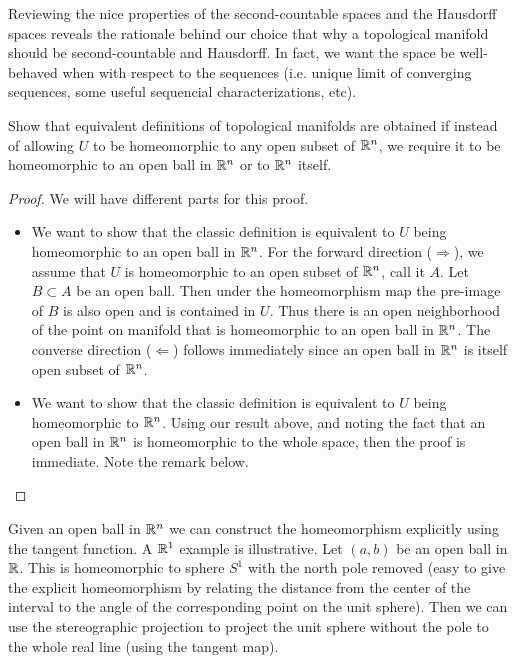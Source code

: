Reviewing the nice properties of the second-countable spaces and the Hausdorff spaces reveals the rationale behind our choice that why a topological manifold should be second-countable and Hausdorff. In fact, we want the space be well-behaved when with respect to the sequences (i.e. unique limit of converging sequences, some useful sequencial characterizations, etc).


\begin{problem}
	Show that equivalent definitions of topological manifolds are obtained if instead of allowing $ U $ to be homeomorphic to any open subset of $ \mathbb{R}^n $, we require it to be homeomorphic to an open ball in $ \mathbb{R}^n $ or to $ \mathbb{R}^n $ itself.
\end{problem}
\begin{proof}
	We will have different parts for this proof.
	\begin{itemize}
		\item We want to show that the classic definition is equivalent to $ U $ being homeomorphic to an open ball in $ \mathbb{R}^n $. For the forward direction ($ \boxed{\Longrightarrow} $), we assume that $ U $ is homeomorphic to an open subset of $ \mathbb{R}^n $, call it $ A $. Let $ B \subset A $ be an open ball. Then under the homeomorphism map the pre-image of $ B $ is also open and is contained in $ U $. Thus there is an open neighborhood of the point on manifold that is homeomorphic to an open ball in $ \mathbb{R}^n $. The converse direction ($ \boxed{\Longleftarrow} $) follows immediately since an open ball in $ \mathbb{R}^n $ is itself open subset of $ \mathbb{R}^n $.
		
		\item We want to show that the classic definition is equivalent to $ U $ being homeomorphic to $ \mathbb{R}^n $. Using our result above, and noting the fact that an open ball in $ \mathbb{R}^n $ is homeomorphic to the whole space, then the proof is immediate. Note the remark below.
	\end{itemize}
\end{proof}
\begin{remark}
	Given an open ball in $ \mathbb{R}^n $ we can construct the homeomorphism explicitly using the tangent function. A $ \mathbb{R}^1 $ example is illustrative. Let $ (a,b) $ be an open ball in $ \mathbb{R} $. This is homeomorphic to sphere $ S^1 $ with the north pole removed (easy to give the explicit homeomorphism by relating the distance from the center of the interval to the angle of the corresponding point on the unit sphere). Then we can use the stereographic projection to project the unit sphere without the pole to the whole real line (using the tangent map).
\end{remark}










